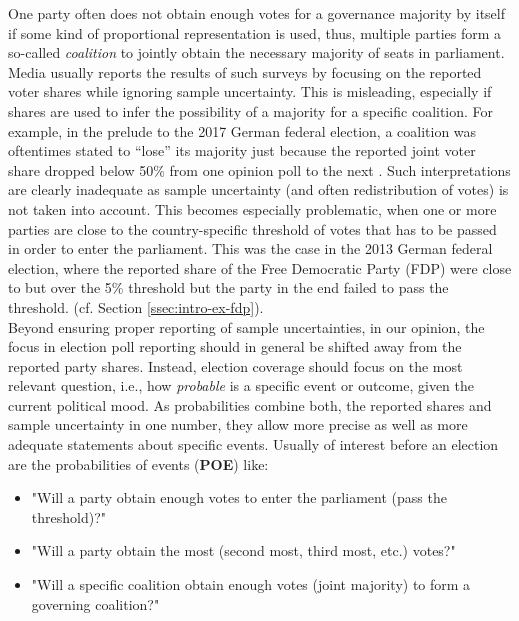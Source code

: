 \documentclass[smallcondensed]{svjour3}     %
\begin{document}
One party often does not obtain enough votes for a governance majority by itself 
if some kind of proportional representation is used, thus, multiple parties form 
a so-called \emph{coalition} to jointly obtain the necessary majority of seats 
in parliament. Media usually reports the results of such surveys by focusing
on the reported voter shares while ignoring sample uncertainty. This is misleading,
especially if shares are used to infer the possibility of a majority for
a specific coalition. For example, in the prelude to the 2017 German federal election,
a coalition was oftentimes stated to ``lose'' its majority just because the reported joint
voter share dropped below 50\% from one opinion poll to the next \citep[cf.][]{umfrage_2017}.
Such interpretations are clearly inadequate as sample uncertainty
(and often redistribution of votes) is not taken into account. This becomes especially
problematic, when one or more parties are close to the country-specific threshold
of votes that has to be passed in order to enter the parliament. This was the case
in the 2013 German federal election, where the reported share of the Free Democratic
Party (FDP) were close to but over the 5\% threshold but the party in the end failed 
to pass the threshold. (cf. Section \ref{ssec:intro-ex-fdp}).\\


Beyond ensuring proper reporting of sample uncertainties, in our opinion, the
focus in election poll reporting should in general be shifted away from the
reported party shares. Instead, election coverage should focus on the most relevant
question, i.e., how {\it probable} is a specific event or outcome, given
the current political mood. As probabilities combine both, the reported shares and 
sample uncertainty in one number, they allow more precise as well as more adequate 
statements about specific events. Usually of interest before an election are the
probabilities of events (\textbf{POE}) like:

\begin{itemize}
  \item "Will a party obtain enough votes to enter the parliament (pass the threshold)?"
  \item "Will a party obtain the most (second most, third most, etc.) votes?"
  \item "Will a specific coalition obtain enough votes (joint majority) to form a governing coalition?"
\end{itemize}
\end{document}
